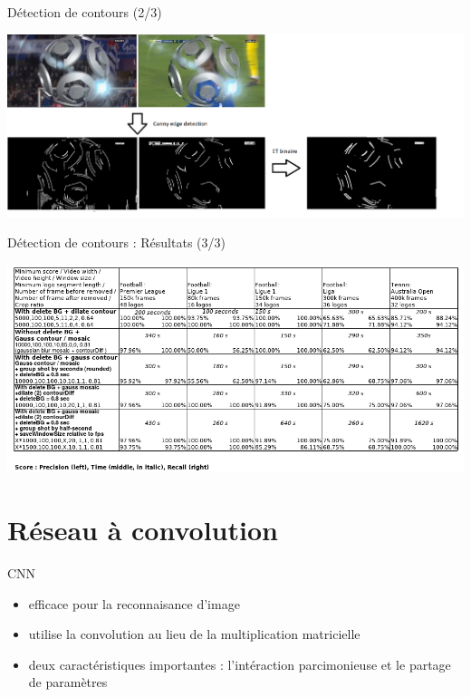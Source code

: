 \documentclass[presentation]{beamer}
\begin{document}
\begin{frame}[label={sec:org4b309cd}]{Détection de contours (2/3)}
\begin{center}
\includegraphics[width=.9\linewidth]{comparison_idea.png}
\end{center}
\end{frame}

\begin{frame}[label={sec:orgd30f5ed}]{Détection de contours : Résultats (3/3)}
\begin{center}
\includegraphics[width=.9\linewidth]{res_match_contour.png}
\end{center}
\end{frame}

\section{Réseau à convolution}
\label{sec:orgbca906d}
\begin{frame}[label={sec:orgc4f6df9}]{CNN}
\begin{itemize}
\item efficace pour la reconnaisance d'image
\item utilise la convolution au lieu de la multiplication matricielle
\item deux caractéristiques importantes : l'intéraction parcimonieuse et le partage de paramètres
\end{itemize}
\end{frame}
\end{document}
